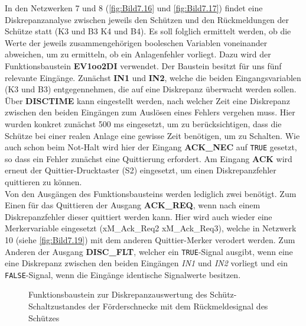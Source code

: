 In den Netzwerken 7 und 8 (\autoref{fig:Bild7.16} und \autoref{fig:Bild7.17}) findet eine Diskrepanzanalyse zwischen jeweils den Schützen und den Rückmeldungen der Schütze statt (K3 und B3 \bzw K4 und B4). Es soll folglich ermittelt werden, ob die Werte der jeweils zusammengehörigen booleschen Variablen voneinander abweichen, um zu ermitteln, ob ein Anlagenfehler vorliegt. Dazu wird der Funktionsbaustein \textbf{EV1oo2DI} verwendet. Der Baustein besitzt für uns fünf relevante Eingänge. Zunächst \textbf{IN1} und \textbf{IN2}, welche die beiden Eingangsvariablen (\zB K3 und B3) entgegennehmen, die auf eine Diskrepanz überwacht werden sollen. Über \textbf{DISCTIME} kann eingestellt werden, nach welcher Zeit eine Diskrepanz zwischen den beiden Eingängen zum Auslösen eines Fehlers vergehen muss. Hier wurden konkret zunächst 500 ms eingesetzt, um zu berücksichtigen, dass die Schütze bei einer realen Anlage eine gewisse Zeit benötigen, um zu Schalten. Wie auch schon beim Not-Halt wird hier der Eingang \textbf{ACK\_NEC} auf \texttt{TRUE} gesetzt, so dass ein Fehler zunächst eine Quittierung erfordert. Am Eingang \textbf{ACK} wird erneut der Quittier-Drucktaster (S2) eingesetzt, um einen Diskrepanzfehler quittieren zu können. \\
Von den Ausgängen des Funktionsbausteins werden lediglich zwei benötigt. Zum Einen für das Quittieren der Ausgang \textbf{ACK\_REQ}, wenn nach einem Diskrepanzfehler dieser quittiert werden kann. Hier wird auch wieder eine Merkervariable eingesetzt (xM\_Ack\_Req2 \bzw xM\_Ack\_Req3), welche in Netzwerk 10 (siehe \autoref{fig:Bild7.19}) mit dem anderen Quittier-Merker verodert werden. Zum Anderen der Ausgang \textbf{DISC\_FLT}, welcher ein \texttt{TRUE}-Signal ausgibt, wenn eine eine Diskrepanz zwischen den beiden Eingängen \textit{IN1} und \textit{IN2} vorliegt und ein \texttt{FALSE}-Signal, wenn die Eingänge identische Signalwerte besitzen.

\begin{figure}[H]
   \centering
   \caption[Diskrepanzauswertung Schütz Förderschnecke]{Funktionsbaustein zur Diskrepanzauswertung des Schütz-Schaltzustandes der Förderschnecke mit dem Rückmeldesignal des Schützes}
   \label{fig:Bild7.16}
\end{figure}

